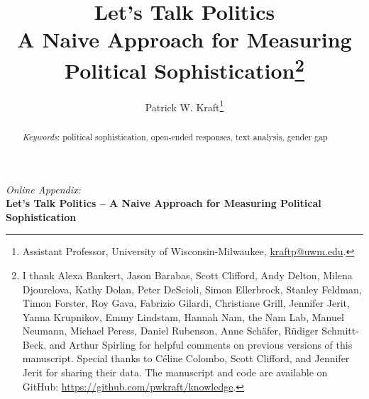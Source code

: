 \documentclass[12pt]{article}
\author{Patrick W. Kraft\footnote{Assistant Professor, University of Wisconsin-Milwaukee, \href{mailto:kraftp@uwm.edu}{kraftp@uwm.edu}.}}
\title{Let's Talk Politics\\
\large{A Naive Approach for Measuring Political Sophistication}\footnote{%
I thank Alexa Bankert, Jason Barabas, Scott Clifford, Andy Delton, Milena Djourelova, Kathy Dolan, Peter DeScioli, Simon Ellerbrock, Stanley Feldman, Timon Forster, Roy Gava, Fabrizio Gilardi, Christiane Grill, Jennifer Jerit, Yanna Krupnikov, Emmy Lindstam, Hannah Nam, the Nam Lab, Manuel Neumann, Michael Peress, Daniel Rubenson, Anne Sch\"afer, R\"udiger Schmitt-Beck, and Arthur Spirling for helpful comments on previous versions of this manuscript. Special thanks to C{\'e}line Colombo, Scott Clifford, and Jennifer Jerit for sharing their data. The manuscript and code are available on GitHub: \url{https://github.com/pwkraft/knowledge}.}
}
\date{}
\begin{document}
\maketitle
\doublespacing
\thispagestyle{empty}


\hfill
\begin{abstract}\singlespacing
\noindent 


\vspace{\baselineskip}
\noindent \textit{Keywords}: political sophistication, open-ended responses, text analysis, gender gap

\vspace{\baselineskip}
\end{abstract}
\hfill

\newpage\setcounter{page}{1}





\clearpage
\singlespacing
\renewcommand\thesubsection{\Roman{subsection}}
\setcounter{page}{1}
\appendices
\textit{Online Appendix:}\\
\textbf{Let's Talk Politics -- A Naive Approach for Measuring Political Sophistication}

\startcontents[sections]
\clearpage


\end{document}

